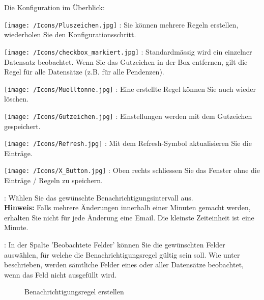 Die Konfiguration im Überblick:

\begin{compactitem}
	\item \texttt{[image: /Icons/Pluszeichen.jpg]} : Sie können mehrere Regeln erstellen, wiederholen Sie den Konfigurationsschritt.
	\item \texttt{[image: /Icons/checkbox\_markiert.jpg]} : Standardmässig wird ein einzelner Datensatz beobachtet. Wenn Sie das Gutzeichen in der Box entfernen, gilt die Regel für alle Datensätze (z.B. für alle Pendenzen).
	\item \texttt{[image: /Icons/Muelltonne.jpg]} : Eine erstellte Regel können Sie auch wieder löschen.
	\item \texttt{[image: /Icons/Gutzeichen.jpg]} : Einstellungen werden mit dem Gutzeichen gespeichert.
	\item \texttt{[image: /Icons/Refresh.jpg]} : Mit dem Refresh-Symbol aktualisieren Sie die Einträge.
	\item \texttt{[image: /Icons/X\_Button.jpg]} : Oben rechts schliessen Sie das Fenster ohne die Einträge / Regeln zu speichern.
	\item {}: Wählen Sie das gewünschte Benachrichtigungsintervall aus.\\
	\textbf{Hinweis:} Falls mehrere Änderungen innerhalb einer Minuten gemacht werden, erhalten Sie nicht für jede Änderung eine Email. Die kleinste Zeiteinheit ist eine Minute.
	\item {}: In der Spalte 'Beobachtete Felder' können Sie die gewünschten Felder auswählen, für welche die Benachrichtigungsregel gültig sein soll. Wie unter  beschrieben, werden sämtliche Felder eines oder aller Datensätze beobachtet, wenn das Feld nicht ausgefüllt wird.
\end{compactitem}

\begin{figure}[H]
\caption{Benachrichtigungsregel erstellen}
\end{figure}

